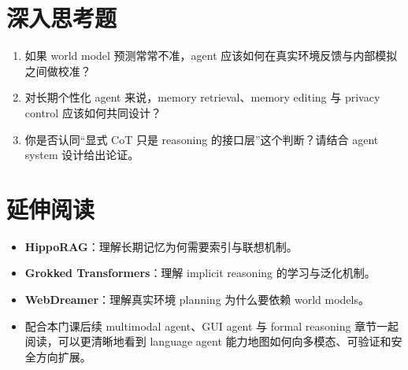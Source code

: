 \documentclass[a4paper]{article}
\begin{document}
\section{深入思考题}

\begin{enumerate}
\item 如果 world model 预测常常不准，agent 应该如何在真实环境反馈与内部模拟之间做校准？
\item 对长期个性化 agent 来说，memory retrieval、memory editing 与 privacy control 应该如何共同设计？
\item 你是否认同“显式 CoT 只是 reasoning 的接口层”这个判断？请结合 agent system 设计给出论证。
\end{enumerate}

\section{延伸阅读}

\begin{itemize}
\item \textbf{HippoRAG}：理解长期记忆为何需要索引与联想机制。
\item \textbf{Grokked Transformers}：理解 implicit reasoning 的学习与泛化机制。
\item \textbf{WebDreamer}：理解真实环境 planning 为什么要依赖 world models。
\item 配合本门课后续 multimodal agent、GUI agent 与 formal reasoning 章节一起阅读，可以更清晰地看到 language agent 能力地图如何向多模态、可验证和安全方向扩展。
\end{itemize}
\end{document}
